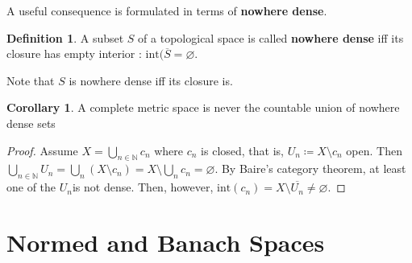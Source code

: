 \documentclass[10pt,a4paper]{article}
\theoremstyle{definition}
\newtheorem{definition}{Definition}
\theoremstyle{cor}
\newtheorem{cor}{Corollary}
\theoremstyle{theorem}
\theoremstyle{lemma}
\theoremstyle{example}
\theoremstyle{remark}
\begin{document}
A useful consequence is formulated in terms of \textbf{nowhere dense}.
\begin{definition}
A subset $S$ of a topological space is called \textbf{nowhere dense} iff its closure has empty interior : $\text{int}(\overline{S} = \varnothing$.
\end{definition}
Note that $S$ is nowhere dense iff its closure is. 

\begin{cor}
A complete metric space is never the countable union of nowhere dense sets
\end{cor}
\begin{proof}
Assume $X = \bigcup_{n\in\mathbb{N}} c_n$ where $c_n$ is closed, that is, $U_n \coloneqq X \setminus c_n$ open. Then $\bigcup_{n\in\mathbb{N}} U_n = \bigcup_{n}(X\setminus c_n) = X \setminus \bigcup_{n} c_n = \varnothing$. By Baire's category theorem, at least one of the $U_n$is not dense. Then, however, $\text{int}(c_n) = X \setminus \overline{U_n} \neq \varnothing$.
\end{proof}

\section{Normed and Banach Spaces}
\end{document}
